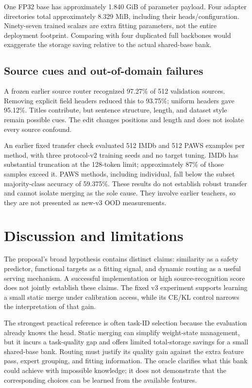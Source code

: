 \documentclass[11pt,a4paper]{article}
\begin{document}
One FP32 base has approximately 1.840 GiB of parameter payload. Four adapter directories total approximately 8.329 MiB, including their heads/configuration. Ninety-seven trained scalars are extra fitting parameters, not the entire deployment footprint. Comparing with four duplicated full backbones would exaggerate the storage saving relative to the actual shared-base bank.

\subsection{Source cues and out-of-domain failures}
A frozen earlier source router recognized 97.27\% of 512 validation sources. Removing explicit field headers reduced this to 93.75\%; uniform headers gave 95.12\%. Titles contribute, but sentence structure, length, and dataset style remain possible cues. The edit changes positions and length and does not isolate every source confound.

An earlier fixed transfer check evaluated 512 IMDb and 512 PAWS examples per method, with three protocol-v2 training seeds and no target tuning. 
IMDb has substantial truncation at the 128-token limit; approximately 87\% of those samples exceed it. PAWS methods, including individual, fall below the subset majority-class accuracy of 59.375\%. These results do not establish robust transfer and cannot isolate merging as the sole cause. They involve earlier teachers, so they are not presented as new-v3 OOD measurements.

\section{Discussion and limitations}
The proposal's broad hypothesis contains distinct claims: similarity as a safety predictor, functional targets as a fitting signal, and dynamic routing as a useful serving mechanism. A successful implementation or high source-recognition score does not jointly establish these claims. The fixed v3 experiment supports learning a small static merge under calibration access, while its CE/KL control narrows the interpretation of that gain. \DiscussionExtension

The strongest practical reference is often task-ID selection because the evaluation already knows the head. Static merging can simplify weight-state management, but it incurs a task-quality gap and offers limited total-storage savings for a small shared-base bank. Routing must justify its quality gain against the extra feature pass, expert grouping, and fitting information. The oracle clarifies what this bank could achieve with impossible knowledge; it does not demonstrate that the corresponding choices can be learned from the available features.
\end{document}

